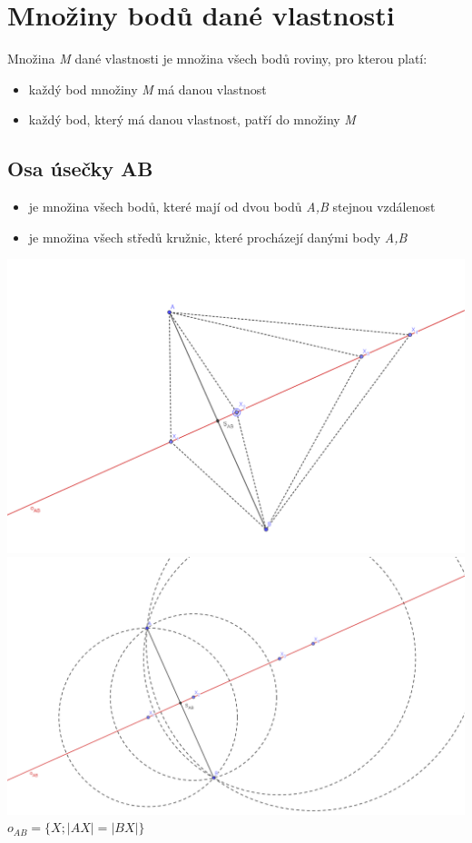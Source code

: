 \documentclass[12pt, a4paper]{article}
\begin{document}
\pagebreak

\section{Množiny bodů dané vlastnosti}
Množina \textit{M} dané vlastnosti je množina všech bodů roviny, pro kterou platí:
\begin{itemize}
\item každý bod množiny \textit{M} má danou vlastnost
\item každý bod, který má danou vlastnost, patří do množiny \textit{M}
\end{itemize}

\subsection*{Osa úsečky AB}
\begin{itemize}
\item je množina všech bodů, které mají od dvou bodů \textit{A,B} stejnou vzdálenost
\item je množina všech středů kružnic, které procházejí danými body \textit{A,B}
\end{itemize}

\includegraphics[scale=0.4]{osausecky1}
\includegraphics[scale=0.4]{osausecky2}
$o_{AB}=\{X; |AX|=|BX|\}$
\end{document}
